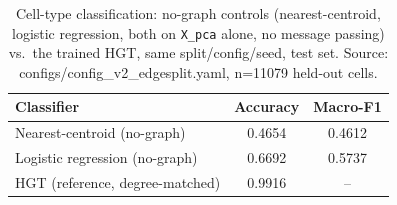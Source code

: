 \begin{table}[h!]
\caption{Cell-type classification: no-graph controls (nearest-centroid, logistic regression, both on \texttt{X\_pca} alone, no message passing) vs.\ the trained HGT, same split/config/seed, test set. Source: configs/config\_v2\_edgesplit.yaml, n=11079 held-out cells.}
\label{tab:celltype_control}
\small
\begin{tabular}{lcc}
\hline
Classifier & Accuracy & Macro-F1 \\
\hline
Nearest-centroid (no-graph) & 0.4654 & 0.4612 \\
Logistic regression (no-graph) & 0.6692 & 0.5737 \\
HGT (reference, degree-matched) & 0.9916 & -- \\
\hline
\end{tabular}
\end{table}
